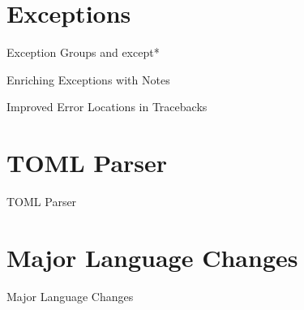 \documentclass[aspectratio=169, xetex, 12pt]{beamer}
\begin{document}
    \section{Exceptions}
    \begin{frame}{Exception Groups and except*}
    \end{frame}

    \begin{frame}{Enriching Exceptions with Notes}
    \end{frame}

    \begin{frame}{Improved Error Locations in Tracebacks}
    \end{frame}

    \section{TOML Parser}
    \begin{frame}{TOML Parser}
    \end{frame}

    \section{Major Language Changes}
    \begin{frame}{Major Language Changes}
    \end{frame}
\end{document}
